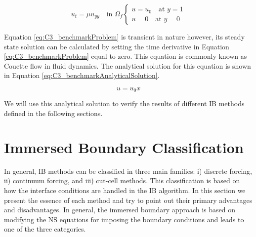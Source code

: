 \begin{subequations}\label{eq:C3_benchmarkProblem}
\begin{equation}
    u_t = \mu u_{yy} \quad \text{in } \Omega_f
\end{equation}
\begin{equation}
\begin{cases}
    u = u_0 \quad \text{at } y = 1 \\
    u = 0 \quad \text{at } y = 0
\end{cases}
\end{equation}
\end{subequations}

Equation \eqref{eq:C3_benchmarkProblem} is transient in nature however, its steady state solution can be calculated by setting the time derivative in Equation \eqref{eq:C3_benchmarkProblem} equal to zero. This equation is commonly known as Couette flow in fluid dynamics. The analytical solution for this equation is shown in Equation \eqref{eq:C3_benchmarkAnalyticalSolution}.

\begin{equation}\label{eq:C3_benchmarkAnalyticalSolution}
    u = u_0 x
\end{equation}

We will use this analytical solution to verify the results of different IB methods defined in the following sections.

\section{Immersed Boundary Classification}
In general, IB methods can be classified in three main families: i) discrete forcing, ii) continuum forcing, and iii) cut-cell methods. This classification is based on how the interface conditions are handled in the IB algorithm. In this section we present the essence of each method and try to point out their primary advantages and disadvantages. In general, the immersed boundary approach is based on modifying the NS equations for imposing the boundary conditions and leads to one of the three categories.





